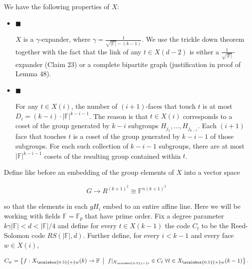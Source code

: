 We have the following properties of $X$:\par


\begin{itemize}


\item[] 
$\blacksquare$ 


$X$ is a $\gamma$-expander, where $\gamma=\frac{1}{\sqrt{\lvert\mathbb{F}\rvert}-(k-1)}$. We use the trickle down theorem together with the fact that the link of any $t\in X(d-2)$ is either a $\frac{1}{\sqrt{\lvert\mathbb{F}\rvert}}$-expander (Claim 23) or a complete bipartite graph (justification in proof of Lemma 48).\par





\item[] 
$\blacksquare$ 


For any $t\in X(i)$, the number of $(i+1)$-faces that touch $t$ is at most $D_{i}=(k-i)\cdot|\mathbb{F}|^{k-i-1}$. The reason is that $t\in X(i)$ corresponds to a coset of the group generated by $k-i$ subgroups $H_{j_{1}},\dots,H_{j_{k-i}}$. Each $(i+1)$ face that touches $t$ is a coset of the group generated by $k-i-1$ of those subgroups. For each such collection of $k-i-1$ subgroups, there are at most $|\mathbb{F}|^{k-i-1}$ cosets of the resulting group contained within $t$.\par





\end{itemize}




Define like before an embedding of the group elements of $X$ into a vector space\par


\[\begin{gathered}
G\to R^{(k+1)^{2}}\cong\mathbb{F}^{n(k+1)^{2}}
\end{gathered}\]


so that the elements in each $gH_{i}$ embed to an entire affine line. Here we will be working with fields $\mathbb{F}=\mathbb{F}_{p}$ that have prime order. Fix a degree parameter $k\gamma|\mathbb{F}|<d<\lvert\mathbb{F}\rvert/4$  and define for every $t\in X(k-1)$ the code $C_{t}$ to be the Reed-Solomon code $RS(\lvert\mathbb{F}\rvert,d)$. Further define, for every $i<k-1$ and every face $w\in X(i)$,\par


\[\begin{gathered}
C_{w}=\left\{f:{X}_{\scalebox{0.5}{+}w}(k)\to\mathbb{F}\nobreak\ \left|\;\vphantom{f:{X}_{\scalebox{0.5}{+}w}(k)\to\mathbb{F}\nobreak\ f|_{{X}_{\scalebox{0.5}{+}t}}\in C_{t}\;\forall t\in{X}_{\scalebox{0.5}{+}w}(k-1)}\right.f|_{{X}_{\scalebox{0.5}{+}t}}\in C_{t}\;\forall t\in{X}_{\scalebox{0.5}{+}w}(k-1)\right\}.
\end{gathered}\]



